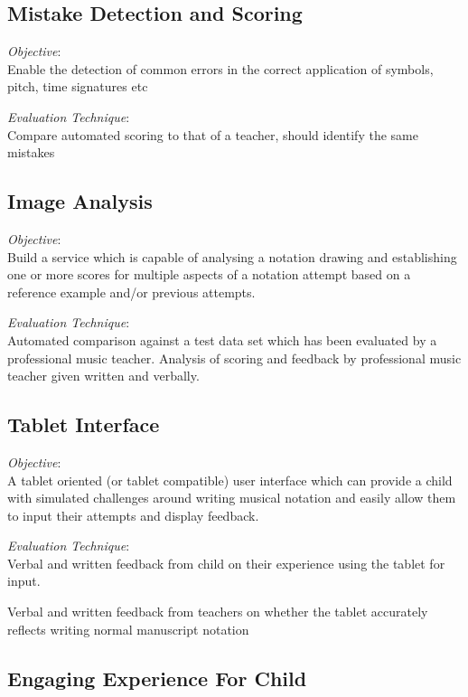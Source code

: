 \subsection{Mistake Detection and Scoring}

\emph{Objective}: \\ 
Enable the detection of common errors in the correct application of symbols, pitch, time signatures etc

\emph{Evaluation Technique}: \\
Compare automated scoring to that of a teacher, should identify the same mistakes

\subsection{Image Analysis}

\emph{Objective}: \\
Build a service which is capable of analysing a notation drawing and establishing one or more scores for multiple aspects of a notation attempt based on a reference example and/or previous attempts.

\emph{Evaluation Technique}: \\
Automated comparison against a test data set which has been evaluated by a professional music teacher.
Analysis of scoring and feedback by professional music teacher given written and verbally.

\subsection{Tablet Interface}

\emph{Objective}: \\
A tablet oriented (or tablet compatible) user interface which can provide a child with simulated challenges around writing musical notation and easily allow them to input their attempts and display feedback.

\emph{Evaluation Technique}: \\
Verbal and written feedback from child on their experience using the tablet for input.

Verbal and written feedback from teachers on whether the tablet accurately reflects writing normal manuscript notation

\subsection{Engaging Experience For Child}

